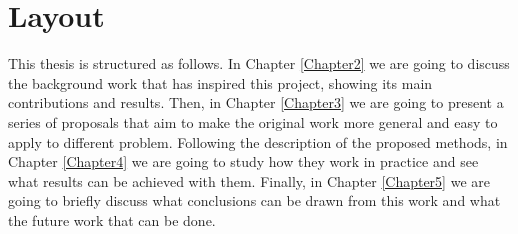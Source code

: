 \section{Layout}

This thesis is structured as follows. In Chapter \ref{Chapter2} we are going to discuss the
background work that has inspired this project, showing its main contributions and results.
Then, in Chapter \ref{Chapter3} we are going to present a series of proposals that
aim to make the original work more general and easy to apply to different problem. Following
the description of the proposed methods, in Chapter \ref{Chapter4} we are going to study how
they work in practice and see what results can be achieved with them. Finally, in Chapter
\ref{Chapter5} we are going to briefly discuss what conclusions can be drawn from this work
and what the future work that can be done.


